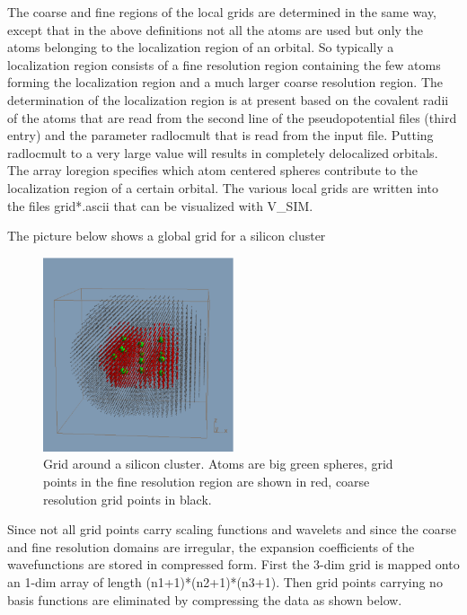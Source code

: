 \documentclass[12pt]{article}
\begin{document}
The coarse and fine regions of the local grids are determined in the same way, except 
that in the above definitions not all the atoms are used but only the atoms belonging 
to the localization region of an orbital. So typically a localization region 
consists of a fine resolution region containing the few atoms forming the localization 
region and a much larger coarse resolution region. The determination of the localization 
region is at present based on the covalent radii of the atoms that 
are read from the second line of the pseudopotential files (third entry) and the 
parameter { \color{red} radlocmult} that is read from the input file. Putting 
radlocmult to a very large value will results in completely delocalized orbitals.
The array { \color{red} loregion} specifies which atom centered spheres contribute 
to the localization region of a certain orbital.
The various local grids are written into the files { \color{red} grid*.ascii} 
that can be visualized with V\_SIM. 

The picture below shows a global grid for a silicon cluster

\vspace{3cm}
\begin{figure}[h]             %
\begin{center}
\setlength{\unitlength}{1cm}
\includegraphics[width=0.5\textwidth]{figrid.pdf}
\caption{ \label{grid} Grid around a silicon cluster. Atoms are big green spheres, 
grid points in the fine resolution region are shown in red, coarse resolution grid points 
in black.}
\end{center}
\end{figure}

\pagebreak \noindent
Since not all grid points carry scaling functions and wavelets and since 
the coarse and fine resolution domains are irregular, the expansion 
coefficients of the wavefunctions are stored in compressed form. First the 
3-dim grid is mapped onto an 1-dim array of length (n1+1)*(n2+1)*(n3+1). Then grid points 
carrying no basis functions are eliminated by compressing the data as shown below.
\end{document}
